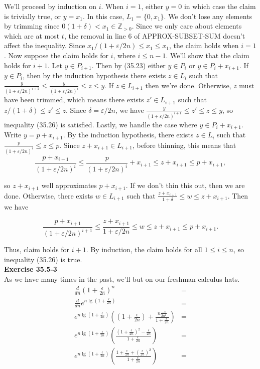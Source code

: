 \documentclass{article}
\begin{document}
We'll proceed by induction on $i$.  When $i=1$, either $y=0$ in which case the claim is trivially true, or $y=x_1$.  In this case, $L_1 = \{0,x_1\}$.  We don't lose any elements by trimming since $0(1+\delta) < x_1 \in \mathbb{Z}_{>0}$.  Since we only care about elements which are at most $t$, the removal in line 6 of APPROX-SUBSET-SUM doesn't affect the inequality.  Since $x_1/(1+\varepsilon/2n) \leq x_1 \leq x_1$, the claim holds when $i=1$.  Now suppose the claim holds for $i$, where $i \leq n-1$.  We'll show that the claim holds for $i+1$. Let $y \in P_{i+1}$.  Then by (35.23) either $y \in P_i$ or $y \in P_i + x_{i+1}$.  If $y \in P_i$, then by the induction hypothesis there exists $z \in L_i$ such that $\frac{y}{(1+\varepsilon/2n)^{i+1}} \leq\frac{y}{(1+\varepsilon/2n)^i} \leq z \leq y$. If $z \in L_{i+1}$ then we're done.  Otherwise, $z$ must have been trimmed, which means there exists $z' \in L_{i+1}$ such that $z/(1+\delta) \leq z' \leq z$.  Since $\delta = \varepsilon/2n$, we have $\frac{y}{(1+\varepsilon/2n)^{i+1}} \leq z' \leq z \leq y$, so inequality (35.26) is satisfied.  Lastly, we handle the case where $y \in P_i + x_{i+1}$.  Write $y = p + x_{i+1}$.  By the induction hypothesis, there exists $z \in L_i$ such that $\frac{p}{(1+\varepsilon/2n)^i} \leq z \leq p$.  Since $z + x_{i+1} \in L_{i+1}$, before thinning, this means that
\[ \frac{p + x_{i+1}}{(1+\varepsilon/2n)^i} \leq \frac{p}{(1+\varepsilon/2n)^i} + x_{i+1} \leq z + x_{i+1} \leq p + x_{i+1},\]

so $z + x_{i+1}$ well approximates $p + x_{i+1}$.  If we don't thin this out, then we are done.  Otherwise, there exists $w \in L_{i+1}$ such that $\frac{z+x_{i+1}}{1 + \delta} \leq w \leq z + x_{i+1}$. Then we have

\[ \frac{p + x_{i+1}}{(1+\varepsilon/2n)^{i+1}} \leq \frac{z + x_{i+1}}{1 + \varepsilon/2n} \leq w \leq z + x_{i+1} \leq p + x_{i+1}.\]

Thus, claim holds for $i+1$. By induction, the claim holds for all $1 \leq i \leq n$, so inequality (35.26) is true. \\


\noindent\textbf{Exercise 35.5-3}\\

As we have many times in the past, we'll but on our freshman calculus hats. 
\begin{align*}
\frac{d}{dn} \left( 1+ \frac{\epsilon}{2n}\right)^n&=\\
\frac{d}{dn} e^{n\lg\left( 1+ \frac{\epsilon}{2n}\right)}&=\\
e^{n\lg\left( 1+ \frac{\epsilon}{2n}\right)}\left(\left( 1+ \frac{\epsilon}{2n}\right) + \frac{n\frac{-\epsilon}{2n^2}}{1 + \frac{\epsilon}{2n}}\right)&=\\
e^{n\lg\left( 1+ \frac{\epsilon}{2n}\right)}\left(\frac{\left( 1+ \frac{\epsilon}{2n}\right)^2  - \frac{\epsilon}{2n}}{1 + \frac{\epsilon}{2n}}\right)&=\\
e^{n\lg\left( 1+ \frac{\epsilon}{2n}\right)}\left(\frac{ 1+ \frac{\epsilon}{2n}+ \left(\frac{\epsilon}{2n}\right)^2  }{1 + \frac{\epsilon}{2n}}\right)&=\end{align*}
\end{document}
